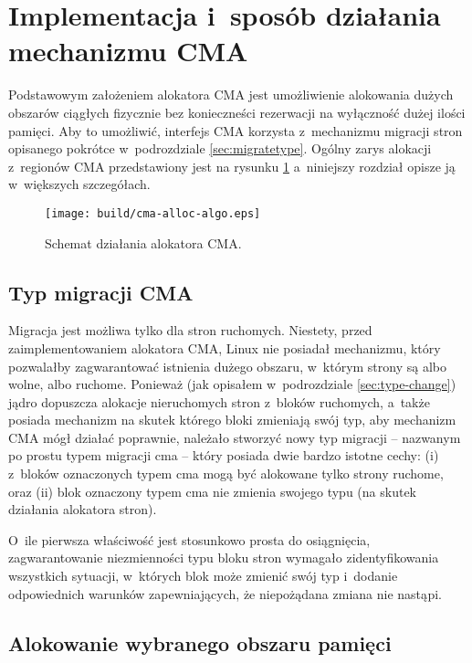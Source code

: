 \section{Implementacja i~sposób działania mechanizmu CMA}

Podstawowym założeniem alokatora CMA jest umożliwienie alokowania
dużych obszarów ciągłych fizycznie bez konieczneści rezerwacji na
wyłączność dużej ilości pamięci.  Aby to umożliwić, interfejs CMA
korzysta z~mechanizmu migracji stron opisanego pokrótce w~podrozdziale
\ref{sec:migratetype}.  Ogólny zarys alokacji z~regionów CMA
przedstawiony jest na rysunku \ref{fig:cma-alloc-algo} a~niniejszy
rozdział opisze ją w~większych szczegółach.

\begin{figure}[tbp]
  \texttt{[image: build/cma-alloc-algo.eps]}
  \caption{Schemat działania alokatora CMA.}
  \label{fig:cma-alloc-algo}
\end{figure}


\subsection{Typ migracji CMA}\label{sec:migrate-cma}

Migracja jest możliwa tylko dla stron ruchomych.  Niestety, przed
zaimplementowaniem alokatora CMA, Linux nie posiadał mechanizmu, który
pozwalałby zagwarantować istnienia dużego obszaru, w~którym strony są
albo wolne, albo ruchome.  Ponieważ (jak opisałem w~podrozdziale
\ref{sec:type-change}) jądro dopuszcza alokacje nieruchomych stron
z~bloków ruchomych, a~także posiada mechanizm na skutek którego bloki
zmieniają swój typ, aby mechanizm CMA mógł działać poprawnie, należało
stworzyć nowy typ migracji -- nazwanym po prostu typem migracji cma --
który posiada dwie bardzo istotne cechy: (i) z~bloków oznaczonych
typem cma mogą być alokowane tylko strony ruchome, oraz (ii) blok
oznaczony typem cma nie zmienia swojego typu (na skutek działania
alokatora stron).

O~ile pierwsza właściwość jest stosunkowo prosta do osiągnięcia,
zagwarantowanie niezmienności typu bloku stron wymagało
zidentyfikowania wszystkich sytuacji, w~których blok może zmienić swój
typ i~dodanie odpowiednich warunków zapewniających, że niepożądana
zmiana nie nastąpi.

\subsection{Alokowanie wybranego obszaru pamięci}\label{sec:alloc-contig-range}


